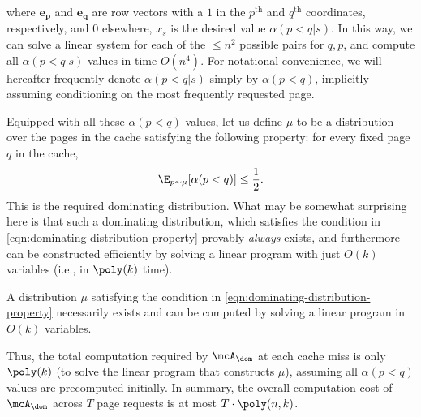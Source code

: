 \documentclass[11pt]{article}
\begin{document}
where $\boldsymbol{e_p}$ and $\boldsymbol{e_q}$ are row vectors with a $1$ in the $p^{\text{th}}$ and $q^{\text{th}}$ coordinates, respectively, and $0$ elsewhere, $x_s$ is the desired value $\alpha(p<q|s)$. In this way, we can solve a linear system for each of the $\le n^2$ possible pairs for $q,p$, and compute all $\alpha(p<q|s)$ values in time $O(n^4)$. For notational convenience, we will hereafter frequently denote $\alpha(p<q|s)$ simply by $\alpha(p<q)$, implicitly assuming conditioning on the most frequently requested page.


Equipped with all these $\alpha(p<q)$ values, let us define $\mu$ to be a distribution over the pages in the cache satisfying the following property: for every fixed page $q$ in the cache,
\begin{align}
    \label{eqn:dominating-distribution-property}
    \E_{p \sim \mu}[\alpha(p<q)] \le \frac{1}{2}.
\end{align}
This is the required dominating distribution. What may be somewhat surprising here is that such a dominating distribution, which satisfies the condition in \eqref{eqn:dominating-distribution-property} provably \textit{always} exists, and furthermore can be constructed efficiently by solving a linear program with just $O(k)$ variables (i.e., in $\poly(k)$ time).
\begin{theorem}
    \label{thm:dominating-distribution-exists}
    A distribution $\mu$ satisfying the condition in \eqref{eqn:dominating-distribution-property} necessarily exists and can be computed by solving a linear program in $O(k)$ variables.
\end{theorem}
Thus, the total computation required by $\mcA_\dom$ at each cache miss is only $\poly(k)$ (to solve the linear program that constructs $\mu$), assuming all $\alpha(p<q)$ values are precomputed initially. In summary, the overall computation cost of $\mcA_\dom$ across $T$ page requests is at most $T \cdot \poly(n, k)$.
\end{document}
